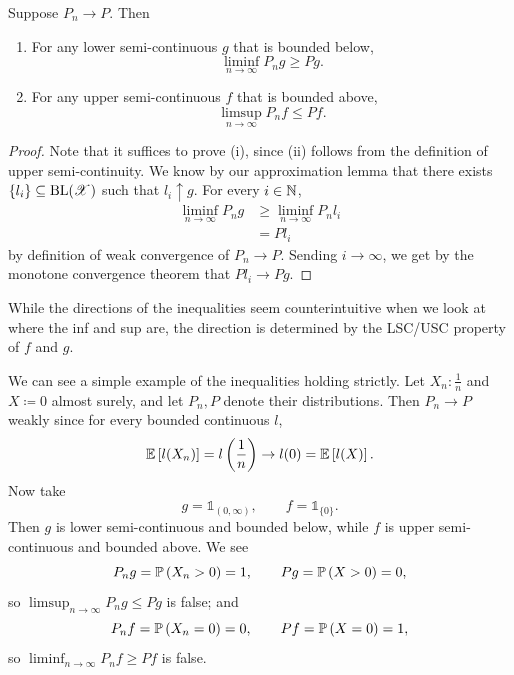 \begin{lemma} \label{2-5-1}
	Suppose $P_n \to P$. Then 
	\begin{enumerate}[label=(\roman*)]
		\item For any lower semi-continuous $g$ that is bounded below, \[
			\liminf\limits_{n \to \infty} P_n g \ge Pg
		.\] 
		\item For any upper semi-continuous $f$ that is bounded above, \[
			\limsup\limits_{n \to \infty} P_n f \le Pf
		.\] 
	\end{enumerate}
\end{lemma}

\begin{proof}
	Note that it suffices to prove (i), since (ii) follows from the definition of upper semi-continuity. We know by our approximation lemma that there exists $\left\{ l_i\right\} \subseteq \BL(\mathscr{X})$ such that $l_i \uparrow g$. For every $i \in \N$,
	\begin{align*}
		\liminf\limits_{n \to \infty} P_n g
		&\ge \liminf\limits_{n \to \infty} P_n l_i \\
		&= P l_i 
	\end{align*}
	by definition of weak convergence of $P_n \to P$.
	Sending $i \to \infty$, we get by the monotone convergence theorem that $P l_i \to P g$. 
\end{proof}

\begin{example}
	While the directions of the inequalities seem counterintuitive when we look at where the inf and sup are, the direction is determined by the LSC/USC property of $f$ and $g$. 

	We can see a simple example of the inequalities holding strictly. Let $X_n : \frac{1}{n}$ and $X \coloneqq 0$ almost surely, and let $P_n,P$ denote their distributions. Then $P_n \to P$ weakly since for every bounded continuous $l$,
	\[
		\E\left[l(X_n)\right] = l\left( \frac{1}{n} \right) \to l(0) = \E\left[l(X)\right].
	\]
	Now take
	\[
		g = \mathds{1}_{(0,\infty)},
		\qquad
		f = \mathds{1}_{\{0\}}.
	\]
	Then $g$ is lower semi-continuous and bounded below, while $f$ is upper semi-continuous and bounded above. We see
	\[
		P_n g = \P\left(X_n > 0\right) = 1,
		\qquad
		P g = \P\left(X > 0\right) = 0,
	\]
	so $\limsup_{n\to\infty} P_n g \le P g$ is false; and
	\[
		P_n f = \P\left(X_n = 0\right) = 0,
		\qquad
		P f = \P\left(X = 0\right) = 1,
	\]
	so $\liminf_{n\to\infty} P_n f \ge P f$ is false.
\end{example}

